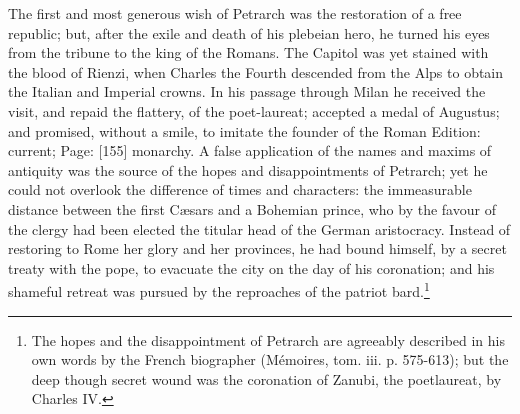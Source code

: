 The first and most generous wish of Petrarch was the restoration of a free republic; but, after the exile and death of his plebeian hero, he turned his eyes from the tribune to the king of the Romans. The Capitol was yet stained with the blood of Rienzi, when Charles the Fourth descended from the Alps to obtain the Italian and Imperial crowns. In his passage through Milan he received the visit, and repaid the flattery, of the poet-laureat; accepted a medal of Augustus; and promised, without a smile, to imitate the founder of the Roman Edition: current; Page: [155] monarchy. A false application of the names and maxims of antiquity was the source of the hopes and disappointments of Petrarch; yet he could not overlook the difference of times and characters: the immeasurable distance between the first Cæsars and a Bohemian prince, who by the favour of the clergy had been elected the titular head of the German aristocracy. Instead of restoring to Rome her glory and her provinces, he had bound himself, by a secret treaty with the pope, to evacuate the city on the day of his coronation; and his shameful retreat was pursued by the reproaches of the patriot bard.\footnote{The hopes and the disappointment of Petrarch are agreeably described in his own words by the French biographer (Mémoires, tom. iii. p. 575-613); but the deep though secret wound was the coronation of Zanubi, the poetlaureat, by Charles IV.}

